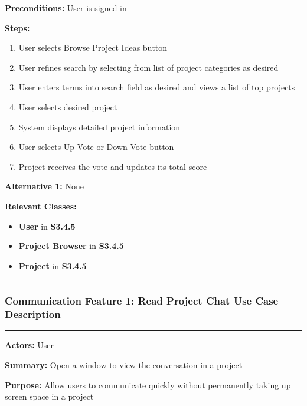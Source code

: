 \documentclass[twoside,letterpaper]{article}
\begin{document}
	\noindent\textbf{Preconditions:} User is signed in \newline
	
	\noindent\textbf{Steps:} \begin{enumerate}
		\item User selects Browse Project Ideas button
		\item User refines search by selecting from list of project categories as desired
		\item User enters terms into search field as desired and views a list of top projects
		\item User selects desired project
		\item System displays detailed project information
		\item User selects Up Vote or Down Vote button
		\item Project receives the vote and updates its total score
	\end{enumerate}
	\noindent\textbf{Alternative 1:} None \newline
	
	
	\noindent\textbf{Relevant Classes:}
	\begin{itemize}
		\item \textbf{User} in \textbf{S3.4.5}
		\item \textbf{Project Browser} in \textbf{S3.4.5}
		\item \textbf{Project} in \textbf{S3.4.5}
	\end{itemize}
	\hrule
	\newpage


	
	
	\subsubsection[Communication Feature 1: Read Project Chat Use Case Description]{\rmfamily\bfseries\color{black}
		Communication Feature 1: Read Project Chat Use Case Description}
	\hypertarget{RefHeading22059017292}{}
	
	\vspace{2pt}
	\hrule
	\vspace{8pt}
	\textbf{Actors:} User \newline
	
	\noindent\textbf{Summary:} Open a window to view the conversation in a project  \newline
	
	\noindent\textbf{Purpose:} Allow users to communicate quickly without permanently taking up screen space in a project \newline
	
\end{document}
